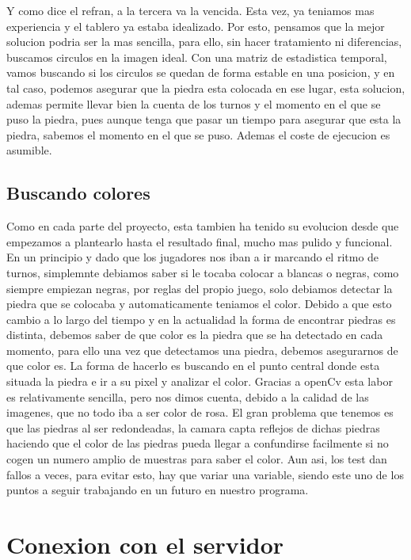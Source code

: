 \documentclass[12pt,a4paper]{report}
\begin{document}
Y como dice el refran, a la tercera va la vencida. Esta vez, ya teniamos mas experiencia y el tablero ya estaba idealizado. Por esto, pensamos que la mejor solucion podria ser la mas sencilla, para ello, sin hacer tratamiento ni diferencias, buscamos circulos en la imagen ideal. Con una matriz de estadistica temporal, vamos buscando si los circulos se quedan de forma estable en una posicion, y en tal caso, podemos asegurar que la piedra esta colocada en ese lugar, esta solucion, ademas permite llevar bien la cuenta de los turnos y el momento en el que se puso la piedra, pues aunque tenga que pasar un tiempo para asegurar que esta la piedra, sabemos el momento en el que se puso. Ademas el coste de ejecucion es asumible.

\subsection{Buscando colores}%

Como en cada parte del proyecto, esta tambien ha tenido su evolucion desde que empezamos a plantearlo hasta el resultado final, mucho mas pulido y funcional. En un principio y dado que los jugadores nos iban a ir marcando el ritmo de turnos, simplemnte debiamos saber si le tocaba colocar a blancas o negras, como siempre empiezan negras, por reglas del propio juego, solo debiamos detectar la piedra que se colocaba y automaticamente teniamos el color.
Debido a que esto cambio a lo largo del tiempo y en la actualidad la forma de encontrar piedras es distinta, debemos saber de que color es la piedra que se ha detectado en cada momento, para ello una vez que detectamos una piedra, debemos asegurarnos de que color es. La forma de hacerlo es buscando en el punto central donde esta situada la piedra e ir a su pixel y analizar el color. Gracias a openCv esta labor es relativamente sencilla, pero nos dimos cuenta, debido a la calidad de las imagenes, que no todo iba a ser color de rosa. El gran problema que tenemos es que las piedras al ser redondeadas, la camara capta reflejos de dichas piedras haciendo que el color de las piedras pueda llegar a confundirse facilmente si no cogen un numero amplio de muestras para saber el color. Aun asi, los test dan fallos a veces, para evitar esto, hay que variar una variable, siendo este uno de los puntos a seguir trabajando en un futuro en nuestro programa.

\section{Conexion con el servidor}
\end{document}
